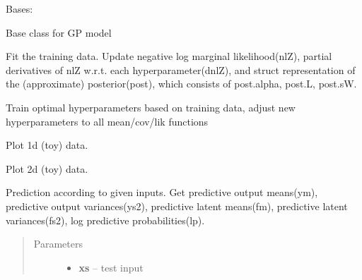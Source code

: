 \documentclass[letterpaper,10pt,english]{sphinxmanual}
\begin{document}
\begin{fulllineitems}
\label{pyGPs.Core:pyGPs.Core.gp.GP}
Bases: 

Base class for GP model

\begin{fulllineitems}
\label{pyGPs.Core:pyGPs.Core.gp.GP.fit}
Fit the training data. Update negative log marginal likelihood(nlZ), 
partial derivatives of nlZ w.r.t. each hyperparameter(dnlZ),
and struct representation of the (approximate) posterior(post), 
which consists of post.alpha, post.L, post.sW.

\end{fulllineitems}


\begin{fulllineitems}
\label{pyGPs.Core:pyGPs.Core.gp.GP.optimize}
Train optimal hyperparameters based on training data,
adjust new hyperparameters to all mean/cov/lik functions

\end{fulllineitems}


\begin{fulllineitems}
\label{pyGPs.Core:pyGPs.Core.gp.GP.plotData_1d}
Plot 1d (toy) data.

\end{fulllineitems}


\begin{fulllineitems}
\label{pyGPs.Core:pyGPs.Core.gp.GP.plotData_2d}
Plot 2d (toy) data.

\end{fulllineitems}


\begin{fulllineitems}
\label{pyGPs.Core:pyGPs.Core.gp.GP.predict}
Prediction according to given inputs.
Get predictive output means(ym), 
predictive output variances(ys2),
predictive latent means(fm),
predictive latent variances(fs2),
log predictive probabilities(lp).
\begin{quote}\begin{description}
\item[{Parameters}] \leavevmode\begin{itemize}
\item {} 
\textbf{xs} -- test input


\end{itemize}
\end{description}
\end{quote}
\end{fulllineitems}
\end{fulllineitems}
\end{document}
